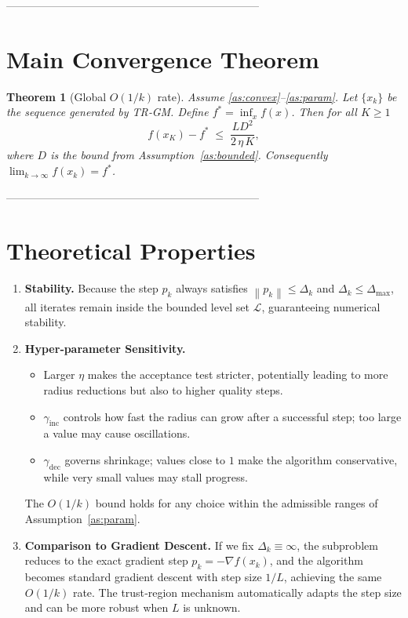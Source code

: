 \documentclass{article}
\newtheorem{theorem}{Theorem}
\newcommand{\norm}[1]{\left\lVert#1\right\rVert}
\begin{document}
---------------------------------------------------------------------

\section*{Main Convergence Theorem}
\begin{theorem}[Global $O(1/k)$ rate]\label{thm:rate}
Assume \ref{as:convex}–\ref{as:param}. Let $\{x_{k}\}$ be the sequence generated by TR‑GM.
Define $f^{*}= \inf_{x}f(x)$. Then for all $K\ge1$
\[
f(x_{K})-f^{*}\;\le\;
\frac{L D^{2}}{2\,\eta\,K},
\]
where $D$ is the bound from Assumption~\ref{as:bounded}.
Consequently $\displaystyle\lim_{k\to\infty}f(x_{k})=f^{*}$.
\end{theorem}

---------------------------------------------------------------------

\section*{Theoretical Properties}
\begin{enumerate}[label=\arabic*.]
\item \textbf{Stability.}  Because the step $p_{k}$ always satisfies $\norm{p_{k}}\le\Delta_{k}$ and $\Delta_{k}\le\Delta_{\max}$, all iterates remain inside the bounded level set $\mathcal{L}$, guaranteeing numerical stability.
\item \textbf{Hyper‑parameter Sensitivity.}
    \begin{itemize}
        \item Larger $\eta$ makes the acceptance test stricter, potentially leading to more radius reductions but also to higher quality steps.
        \item $\gamma_{\text{inc}}$ controls how fast the radius can grow after a successful step; too large a value may cause oscillations.
        \item $\gamma_{\text{dec}}$ governs shrinkage; values close to $1$ make the algorithm conservative, while very small values may stall progress.
    \end{itemize}
    The $O(1/k)$ bound holds for any choice within the admissible ranges of Assumption~\ref{as:param}.
\item \textbf{Comparison to Gradient Descent.}
    If we fix $\Delta_{k}\equiv\infty$, the subproblem reduces to the exact gradient step $p_{k}=-\nabla f(x_{k})$, and the algorithm becomes standard gradient descent with step size $1/L$, achieving the same $O(1/k)$ rate. The trust‑region mechanism automatically adapts the step size and can be more robust when $L$ is unknown.
\end{enumerate}
\end{document}
